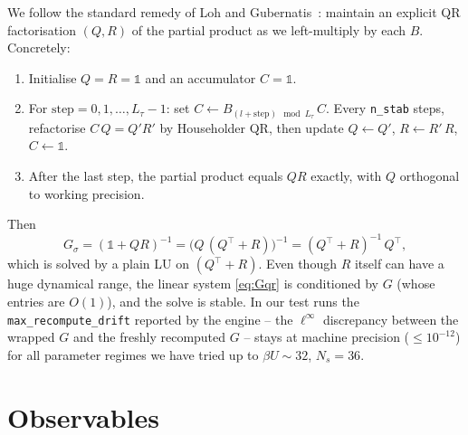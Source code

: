 \documentclass[11pt,a4paper]{article}
\newcommand{\Ns}{N_{s}}
\newcommand{\Lt}{L_\tau}
\theoremstyle{plain}
\begin{document}
We follow the standard remedy of Loh and
Gubernatis~\cite{LohGubernatis1992}: maintain an explicit
QR factorisation \((Q,R)\) of the partial product as we left-multiply by
each \(B\). Concretely:
\begin{enumerate}[leftmargin=*]
    \item Initialise \(Q = R = \mathbb{1}\) and an accumulator \(C = \mathbb{1}\).
    \item For \(\text{step} = 0, 1, \ldots, \Lt - 1\): set
          \(C \leftarrow B_{(l + \text{step})\!\!\mod \Lt}\, C\). Every
          \texttt{n\_stab} steps, refactorise
          \(C\,Q = Q' R'\) by Householder QR, then update
          \(Q \leftarrow Q'\), \(R \leftarrow R'\,R\), \(C \leftarrow \mathbb{1}\).
    \item After the last step, the partial product equals \(Q R\)
          exactly, with \(Q\) orthogonal to working precision.
\end{enumerate}
Then
\begin{equation}
G_\sigma = (\mathbb{1} + Q R)^{-1}
        = \bigl(Q\,(Q^{\!\top} + R)\bigr)^{-1}
        = (Q^{\!\top} + R)^{-1}\, Q^{\!\top},
\label{eq:Gqr}
\end{equation}
which is solved by a plain LU on \((Q^{\!\top} + R)\). Even though
\(R\) itself can have a huge dynamical range, the linear system
\eqref{eq:Gqr} is conditioned by \(G\) (whose entries are
\(O(1)\)), and the solve is stable. In our test runs the
\texttt{max\_recompute\_drift} reported by the engine -- the
\(\ell^\infty\) discrepancy between the wrapped \(G\) and the freshly
recomputed \(G\) -- stays at machine precision (\(\le 10^{-12}\)) for
all parameter regimes we have tried up to \(\beta U \sim 32\),
\(\Ns = 36\).

\section{Observables}
\end{document}

